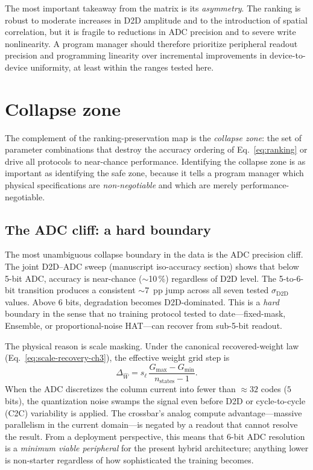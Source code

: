 The most important takeaway from the matrix is its \emph{asymmetry}.  The ranking is robust to moderate increases in D2D amplitude and to the introduction of spatial correlation, but it is fragile to reductions in ADC precision and to severe write nonlinearity.  A program manager should therefore prioritize peripheral readout precision and programming linearity over incremental improvements in device-to-device uniformity, at least within the ranges tested here.


\section{Collapse zone}
\label{sec:collapse-zone}

The complement of the ranking-preservation map is the \emph{collapse zone}: the set of parameter combinations that destroy the accuracy ordering of Eq.~\ref{eq:ranking} or drive all protocols to near-chance performance.  Identifying the collapse zone is as important as identifying the safe zone, because it tells a program manager which physical specifications are \emph{non-negotiable} and which are merely performance-negotiable.

\subsection{The ADC cliff: a hard boundary}

The most unambiguous collapse boundary in the data is the ADC precision cliff.  The joint D2D--ADC sweep (manuscript iso-accuracy section) shows that below 5-bit ADC, accuracy is near-chance ($\sim$10\,\%) regardless of D2D level.  The 5-to-6-bit transition produces a consistent $\sim$7~pp jump across all seven tested $\sigma_{\mathrm{D2D}}$ values.  Above 6 bits, degradation becomes D2D-dominated.  This is a \emph{hard} boundary in the sense that no training protocol tested to date---fixed-mask, Ensemble, or proportional-noise HAT---can recover from sub-5-bit readout.

The physical reason is scale masking.  Under the canonical recovered-weight law (Eq.~\ref{eq:scale-recovery-ch3}), the effective weight grid step is
\begin{equation}
    \Delta_{\hat{W}} = s_{\ell}\,\frac{G_{\max}-G_{\min}}{n_{\mathrm{states}}-1}.
\end{equation}
When the ADC discretizes the column current into fewer than $\approx 32$ codes ($5$ bits), the quantization noise swamps the signal even before D2D or cycle-to-cycle (C2C) variability is applied.  The crossbar's analog compute advantage---massive parallelism in the current domain---is negated by a readout that cannot resolve the result.  From a deployment perspective, this means that $6$-bit ADC resolution is a \emph{minimum viable peripheral} for the present hybrid architecture; anything lower is non-starter regardless of how sophisticated the training becomes.

